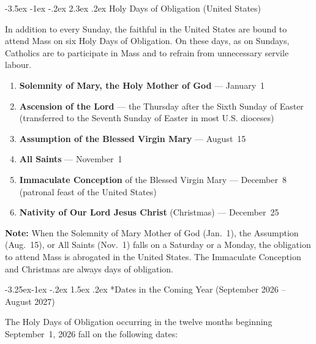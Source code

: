 \documentclass[11pt]{article}
\makeatletter
\renewcommand\section{\@startsection{section}{1}{\z@}%
  {-3.5ex \@plus -1ex \@minus -.2ex}%
  {2.3ex \@plus.2ex}%
  {\normalfont\Large\bfseries\color{churchblue}}}
\renewcommand\subsection{\@startsection{subsection}{2}{\z@}%
  {-3.25ex\@plus -1ex \@minus -.2ex}%
  {1.5ex \@plus .2ex}%
  {\normalfont\large\bfseries\color{churchgold}}}
\makeatother
\begin{document}
\section{Holy Days of Obligation (United States)}

In addition to every Sunday, the faithful in the United States are bound
to attend Mass on six Holy Days of Obligation. On these days, as on
Sundays, Catholics are to participate in Mass and to refrain from
unnecessary servile labour.

\begin{enumerate}
  \item \textbf{Solemnity of Mary, the Holy Mother of God} --- January~1
  \item \textbf{Ascension of the Lord} --- the Thursday after the Sixth Sunday of Easter (transferred to the Seventh Sunday of Easter in most U.S. dioceses)
  \item \textbf{Assumption of the Blessed Virgin Mary} --- August~15
  \item \textbf{All Saints} --- November~1
  \item \textbf{Immaculate Conception} of the Blessed Virgin Mary --- December~8 (patronal feast of the United States)
  \item \textbf{Nativity of Our Lord Jesus Christ} (Christmas) --- December~25
\end{enumerate}

\textbf{Note:} When the Solemnity of Mary Mother of God (Jan.~1), the
Assumption (Aug.~15), or All Saints (Nov.~1) falls on a Saturday or a
Monday, the obligation to attend Mass is abrogated in the United States.
The Immaculate Conception and Christmas are always days of obligation.

\subsection*{Dates in the Coming Year (September 2026 -- August 2027)}

The Holy Days of Obligation occurring in the twelve months beginning
September~1, 2026 fall on the following dates:
\end{document}
